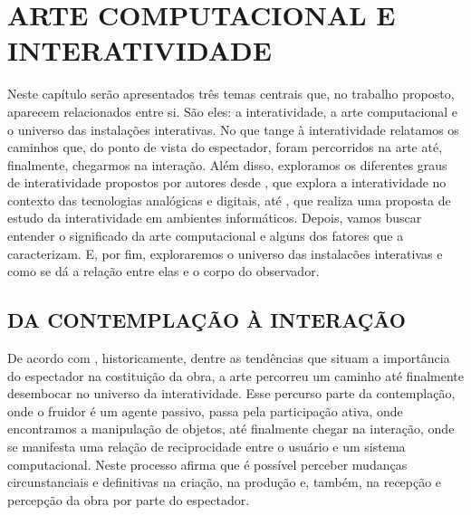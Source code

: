 \chapter{ARTE COMPUTACIONAL E INTERATIVIDADE}

Neste capítulo serão apresentados três temas centrais que, no trabalho proposto, aparecem relacionados entre si. São eles: a interatividade, a arte computacional e o universo das instalações interativas. No que tange à interatividade relatamos os caminhos que, do ponto de vista do espectador, foram percorridos na arte até, finalmente, chegarmos na interação. Além disso, exploramos os diferentes graus de interatividade propostos por autores desde , que explora a interatividade no contexto das tecnologias analógicas e digitais, até  , que realiza uma proposta de estudo da interatividade em ambientes informáticos. Depois, vamos buscar entender o significado da arte computacional e alguns dos fatores que a caracterizam. E, por fim, exploraremos o universo das instalacões interativas e como se dá a relação entre elas e o corpo do observador.




\section{DA CONTEMPLAÇÃO À INTERAÇÃO}

De acordo com , historicamente, dentre as tendências que situam a importância do espectador na costituição da obra, a arte percorreu um caminho até finalmente desembocar no universo da interatividade. Esse percurso parte da contemplação, onde o fruidor é um agente passivo, passa pela participação ativa, onde encontramos a manipulação de objetos, até finalmente chegar na interação, onde se manifesta uma relação de reciprocidade entre o usuário e um sistema computacional. Neste processo  afirma que é possível perceber mudanças circunstanciais e definitivas na criação, na produção e, também, na recepção e percepção da obra por parte do espectador. 

